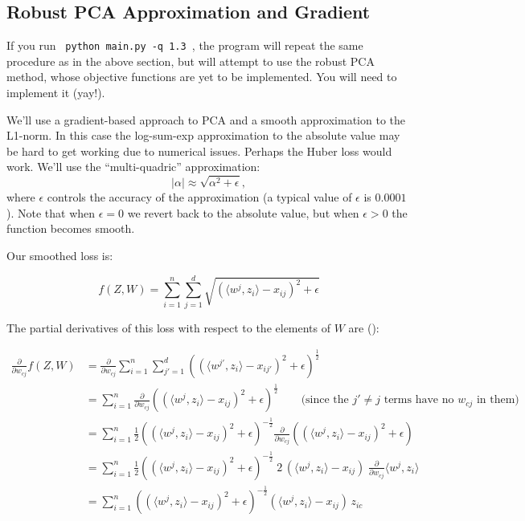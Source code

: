 


\subsection{Robust PCA Approximation and Gradient }

If you run \verb| python main.py -q 1.3 |, the program will repeat the same procedure as in the above section, but will attempt to use the robust PCA method, whose objective functions are yet to be implemented. You will need to implement it (yay!).

We'll use a gradient-based approach to PCA and a smooth approximation to the L1-norm. In this case the log-sum-exp approximation to the absolute value may be hard to get working due to numerical issues. Perhaps the Huber loss would work. We'll use the ``multi-quadric'' approximation:
\[
|\alpha| \approx \sqrt{\alpha^2 + \epsilon},
\]
where $\epsilon$ controls the accuracy of the approximation (a typical value of $\epsilon$ is $0.0001$). Note that when $\epsilon=0$ we revert back to the absolute value, but when $\epsilon>0$ the function becomes smooth.

Our smoothed loss is:

\[
f(Z,W) = \sum_{i=1}^n\sum_{j=1}^d \sqrt{(\langle w^j, z_i\rangle - x_{ij})^2 + \epsilon }
\]

The partial derivatives of this loss with respect to the elements of $W$ are
():

\begin{align*}
\frac{\partial}{\partial w_{cj}} f(Z,W)
  &= \frac{\partial}{\partial w_{cj}} \sum_{i=1}^n\sum_{j'=1}^d \left( (\langle w^{j'}, z_i\rangle - x_{ij'})^2 + \epsilon \right)^{\frac12} \\
  &= \sum_{i=1}^n \frac{\partial}{\partial w_{cj}} \left( (\langle w^{j}, z_i\rangle - x_{ij})^2 + \epsilon \right)^{\frac12}  \qquad \text{(since the $j' \ne j$ terms have no $w_{cj}$ in them)} \\
  &= \sum_{i=1}^n \frac12 \left( (\langle w^{j}, z_i\rangle - x_{ij})^2 + \epsilon \right)^{-\frac12} \frac{\partial}{\partial w_{cj}} \left( (\langle w^{j}, z_i\rangle - x_{ij})^2 + \epsilon \right) \\
  &= \sum_{i=1}^n \frac12  \left( (\langle w^{j}, z_i\rangle - x_{ij})^2 + \epsilon \right)^{-\frac12} \;2\,  (\langle w^{j}, z_i\rangle - x_{ij}) \; \frac{\partial}{\partial w_{cj}} \langle w^{j}, z_i\rangle \\
  &= \sum_{i=1}^n \left( (\langle w^{j}, z_i\rangle - x_{ij})^2 + \epsilon \right)^{-\frac12}  (\langle w^j, z_i\rangle - x_{ij}) \, z_{ic}
\end{align*}

